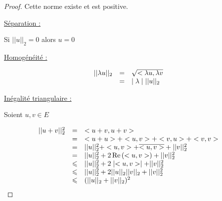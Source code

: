 \begin{proof}
    Cette norme existe et est positive. 

    \quad \underline{Séparation : }

    Si $||u||_2 = 0$ alors $u=0$

    \quad \underline{Homogénéité : }

    \[
    \begin{array}{rcl}
        || \lambda u ||_2 & = & \sqrt{<\lambda u, \lambda v} \\
        \space & = & \mid \lambda \mid ||u||_2
    \end{array}
    \]

    \quad \uline{Inégalité triangulaire :}
    
    Soient $u, v \in E$

    $$
    \begin{array}{rcl}
        ||u + v||^2_2 & = & <u + v, u + v>  \\
        \space & = & <u + u> + <u, v> + <v, u> + <v, v> \\
        \space & = & ||u||_2^2 + <u, v> + \overline{<u, v>} + ||v||_2^2  \\
        \space & =& ||u||_2^2 + 2 \operatorname{Re} \,(<u, v>) + ||v||_2^2 \\
        \space & \leqslant & ||u||_2^2 + 2 \mid <u, v> \mid + ||v||_2^2 \\
        \space & \leqslant & ||u||_2^2 + 2 ||u||_2 ||v||_2 + ||v||_2^2 \\
        \space & \leqslant & (||u||_2 + ||v||_2)^2 \\
    \end{array}
    $$

\end{proof}

